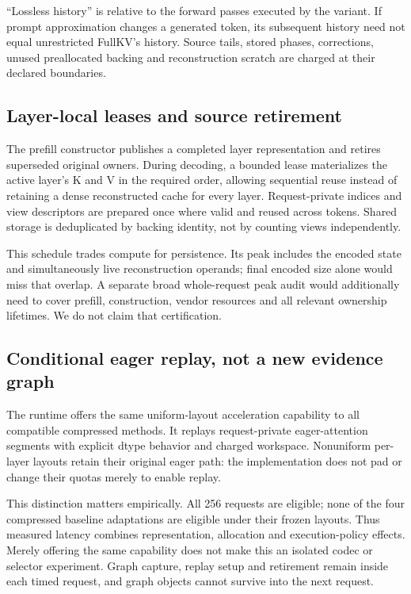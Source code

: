 ``Lossless history'' is relative to the forward passes executed by the
variant. If prompt approximation changes a generated token, its subsequent
history need not equal unrestricted FullKV's history. Source tails, stored
phases, corrections, unused preallocated backing and reconstruction scratch
are charged at their declared boundaries.

\subsection{Layer-local leases and source retirement}
The prefill constructor publishes a completed layer representation and
retires superseded original owners. During decoding, a bounded lease
materializes the active layer's K and V in the required order, allowing
sequential reuse instead of retaining a dense reconstructed cache for every
layer. Request-private indices and view descriptors are prepared once where
valid and reused across tokens. Shared storage is deduplicated by backing
identity, not by counting views independently.

This schedule trades compute for persistence. Its peak includes the encoded
state and simultaneously live reconstruction operands; final encoded size
alone would miss that overlap. A separate broad whole-request peak audit
would additionally need to cover prefill, construction, vendor resources
and all relevant ownership lifetimes. We do not claim that certification.

\subsection{Conditional eager replay, not a new evidence graph}
\label{sec:replay}
The runtime offers the same uniform-layout acceleration capability to all
compatible compressed methods. It replays request-private eager-attention
segments with explicit dtype behavior and charged workspace. Nonuniform
per-layer layouts retain their original eager path: the implementation
does not pad or change their quotas merely to enable replay.

This distinction matters empirically. All 256 \Evi{} requests are eligible;
none of the four compressed baseline adaptations are eligible under their
frozen layouts. Thus measured latency combines representation, allocation
and execution-policy effects. Merely offering the same capability does not
make this an isolated codec or selector experiment. Graph capture, replay
setup and retirement remain inside each timed request, and graph objects
cannot survive into the next request.
